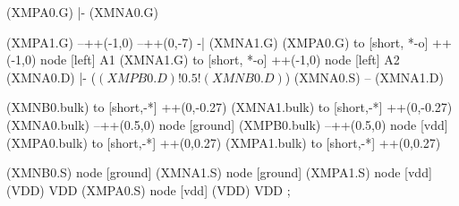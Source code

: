 \begin{circuitikz}[american]
	(XMPA0.G) |- (XMNA0.G)
	
	(XMPA1.G) --++(-1,0) --++(0,-7) -| (XMNA1.G)
	(XMPA0.G) to [short, *-o] ++(-1,0) node [left] {A1}
	(XMNA1.G) to [short, *-o] ++(-1,0) node [left] {A2}
	(XMNA0.D) |- ($(XMPB0.D)!0.5!(XMNB0.D)$)
	(XMNA0.S) -- (XMNA1.D)
	
	(XMNB0.bulk) to [short,-*] ++(0,-0.27)
	(XMNA1.bulk) to [short,-*] ++(0,-0.27)
	(XMNA0.bulk) --++(0.5,0) node [ground]{}
	(XMPB0.bulk) --++(0.5,0) node [vdd]{}
	(XMPA0.bulk) to [short,-*] ++(0,0.27)
	(XMPA1.bulk) to [short,-*] ++(0,0.27)
	

	(XMNB0.S) node [ground] {}
	(XMNA1.S) node [ground] {}
	(XMPA1.S) node [vdd] (VDD) {VDD}
	(XMPA0.S) node [vdd] (VDD) {VDD}
;

\end{circuitikz}
